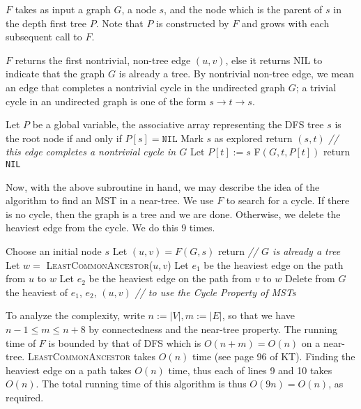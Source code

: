 \documentclass[10pt,reqno]{amsart}
\begin{document}
\begin{outline}[enumerate]
$F$ takes as input a graph $G$, a node $s$, and the node which is the parent of
$s$ in the depth first tree $P$. Note that $P$ is constructed by $F$ and grows
with each subsequent call to $F$.

$F$ returns the first nontrivial, non-tree edge $(u,v)$, else it returns NIL to
indicate that the graph $G$ is already a tree. By nontrivial non-tree edge, we
mean an edge that completes a nontrivial cycle in the undirected graph $G$; a
trivial cycle in an undirected graph is one of the form $s\rightarrow t
\rightarrow s$.

\medskip
\begin{algorithmic}[1]
    \State Let $P$ be a global variable, the associative array representing the DFS tree
    \State $s$ is the root node if and only if $P[s] = \mathtt{NIL}$
    \State Mark $s$ as explored
    \State return $(s,t)$ \emph{// this edge completes a nontrivial cycle in $G$}
    \EndIf
    \State Let $P[t] := s$
    \State F$(G,t,P[t])$
    \EndIf
    \EndFor
    \State return \texttt{NIL}
    \EndProcedure
\end{algorithmic}
\medskip

Now, with the above subroutine in hand, we may describe the idea of the
algorithm to find an MST in a near-tree. We use $F$ to search for a cycle. If
there is no cycle, then the graph is a tree and we are done. Otherwise, we
delete the heaviest edge from the cycle. We do this 9 times.

\medskip
\begin{algorithmic}[1]
    \State Choose an initial node $s$
    \State Let $(u,v) = F(G,s)$
    \State return \emph{// $G$ is already a tree}
    \EndIf
    \State Let $w = $ \textsc{LeastCommonAncestor}($u,v$)
    \State Let $e_1$ be the heaviest edge on the path from $u$ to $w$
    \State Let $e_2$ be the heaviest edge on the path from $v$ to $w$
    \State Delete from $G$ the heaviest of $e_1$, $e_2$, $(u,v)$ \emph{// to use the Cycle Property of MSTs}
    \EndFor
    \EndProcedure
\end{algorithmic}
\medskip

To analyze the complexity, write $n := |V|, m := |E|$, so that we have $n-1 \le
m \le n+8$ by connectedness and the near-tree property. The running time of $F$
is bounded by that of DFS which is $O(n+m) = O(n)$ on a near-tree.
\textsc{LeastCommonAncestor} takes $O(n)$ time (see page 96 of KT). Finding the
heaviest edge on a path takes $O(n)$ time, thus each of lines 9 and 10 takes
$O(n)$. The total running time of this algorithm is thus $O(9n) = O(n)$, as
required.


\end{outline}
\end{document}
